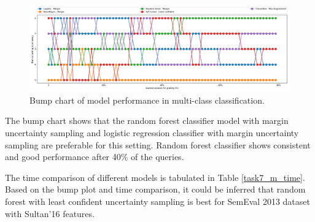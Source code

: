 \begin{figure}[h]
	\centering
	\includegraphics[scale=0.3]{images/task7_rank}
	\caption{Bump chart of model performance in multi-class classification.}
	\label{t7_m_bump}
\end{figure}

The bump chart shows that the random forest classifier model with margin uncertainty sampling and logistic regression classifier with margin uncertainty sampling are preferable for this setting. Random forest classifier shows consistent and good performance after 40\% of the queries. 

The time comparison of different models is tabulated in Table \ref{task7_m_time}. Based on the bump plot and time comparison, it could be inferred that random forest with least confident uncertainty sampling is best for SemEval 2013 dataset with Sultan'16 features.  


